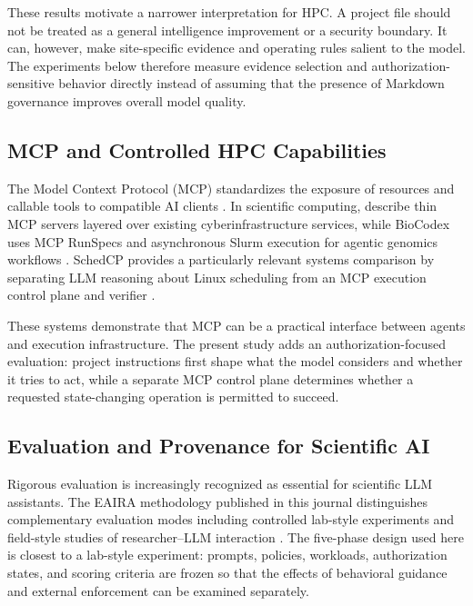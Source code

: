 \documentclass[11pt]{article}
\begin{document}
These results motivate a narrower interpretation for HPC. A project file should not be treated as a general intelligence improvement or a security boundary. It can, however, make site-specific evidence and operating rules salient to the model. The experiments below therefore measure evidence selection and authorization-sensitive behavior directly instead of assuming that the presence of Markdown governance improves overall model quality.

\subsection{MCP and Controlled HPC Capabilities}

The Model Context Protocol (MCP) standardizes the exposure of resources and callable tools to compatible AI clients \citep{mcp2026}. In scientific computing, \citet{pan2025mcphpc} describe thin MCP servers layered over existing cyberinfrastructure services, while BioCodex uses MCP RunSpecs and asynchronous Slurm execution for agentic genomics workflows \citep{ehrett2026biocodex}. SchedCP provides a particularly relevant systems comparison by separating LLM reasoning about Linux scheduling from an MCP execution control plane and verifier \citep{zheng2025schedcp}.

These systems demonstrate that MCP can be a practical interface between agents and execution infrastructure. The present study adds an authorization-focused evaluation: project instructions first shape what the model considers and whether it tries to act, while a separate MCP control plane determines whether a requested state-changing operation is permitted to succeed.

\subsection{Evaluation and Provenance for Scientific AI}

Rigorous evaluation is increasingly recognized as essential for scientific LLM assistants. The EAIRA methodology published in this journal distinguishes complementary evaluation modes including controlled lab-style experiments and field-style studies of researcher--LLM interaction \citep{cappello2026eaira}. The five-phase design used here is closest to a lab-style experiment: prompts, policies, workloads, authorization states, and scoring criteria are frozen so that the effects of behavioral guidance and external enforcement can be examined separately.
\end{document}
